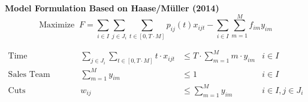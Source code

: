 \begin{frame}{\textbf{Model Formulation Based on Haase/Müller (2014)}}
\footnotesize
\begin{equation}
 \text{Maximize } \ F =  \sum_{i \in I} \sum_{j \in J_i} \sum_{t \in [0,T \cdot M]} p_{ij}(t)  x_{ijt} - \sum_{i \in I} \sum_{m=1}^M f_{im} y_{im}  \label{sfd-mod-of}
\end{equation}

\begin{align}
\text{Time Allocation} && \sum_{ j \in J_i} \sum_{t\in [0,T \cdot M]} t \cdot x_{ijt} &\leq T \cdot \sum_{m=1}^M m \cdot y_{im}  &i \in I \\
\text{Sales Team Assignment} && \sum_{m=1}^M y_{im} &\le 1 &i \in I \\
\text{Cuts} && w_{ij} &\le  \sum_{m = 1}^M y_{im} &i \in I,  j \in J_i 
\end{align}
\normalsize
{}
\end{frame}









